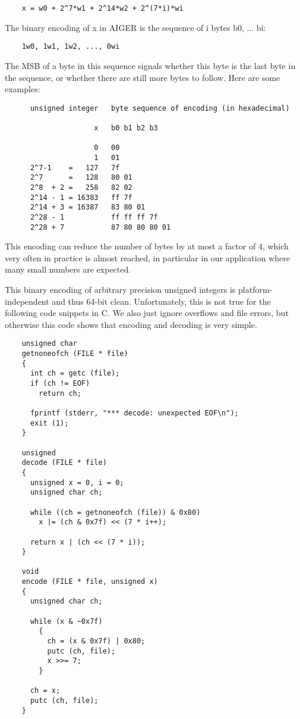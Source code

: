 \documentclass[10pt]{llncs}
\begin{document}
\begin{verbatim}
    x = w0 + 2^7*w1 + 2^14*w2 + 2^(7*i)*wi
\end{verbatim}

  The binary encoding of x in AIGER is the sequence of i bytes b0, ... bi:

\begin{verbatim}
    1w0, 1w1, 1w2, ..., 0wi
\end{verbatim}

  The MSB of a byte in this sequence signals whether this byte is the last
  byte in the sequence, or whether there are still more bytes to follow.
  Here are some examples:
    
\begin{verbatim}
      unsigned integer   byte sequence of encoding (in hexadecimal)
 
                     x   b0 b1 b2 b3
                        
                     0   00
                     1   01
      2^7-1    =   127   7f
      2^7      =   128   80 01
      2^8  + 2 =   258   82 02
      2^14 - 1 = 16383   ff 7f
      2^14 + 3 = 16387   83 80 01
      2^28 - 1           ff ff ff 7f
      2^28 + 7           87 80 80 80 01
\end{verbatim}

  This encoding can reduce the number of bytes by at most a factor of 4,
  which very often in practice is almost reached, in particular in our
  application where many small numbers are expected.
  
  This binary encoding of arbitrary precision unsigned integers is
  platform-independent and thus 64-bit clean.  Unfortunately, this is not
  true for the following code snippets in C.  We also just ignore overflows
  and file errors, but otherwise this code shows that encoding and decoding
  is very simple.

\begin{verbatim}
    unsigned char
    getnoneofch (FILE * file)
    {
      int ch = getc (file);
      if (ch != EOF)
        return ch;

      fprintf (stderr, "*** decode: unexpected EOF\n");
      exit (1);
    }

    unsigned
    decode (FILE * file)
    {
      unsigned x = 0, i = 0;
      unsigned char ch;

      while ((ch = getnoneofch (file)) & 0x80)
        x |= (ch & 0x7f) << (7 * i++);

      return x | (ch << (7 * i));
    }

    void
    encode (FILE * file, unsigned x)
    {
      unsigned char ch;

      while (x & ~0x7f)
        {
          ch = (x & 0x7f) | 0x80;
          putc (ch, file);
          x >>= 7;
        }
     
      ch = x;
      putc (ch, file);
    }
\end{verbatim}
\end{document}
